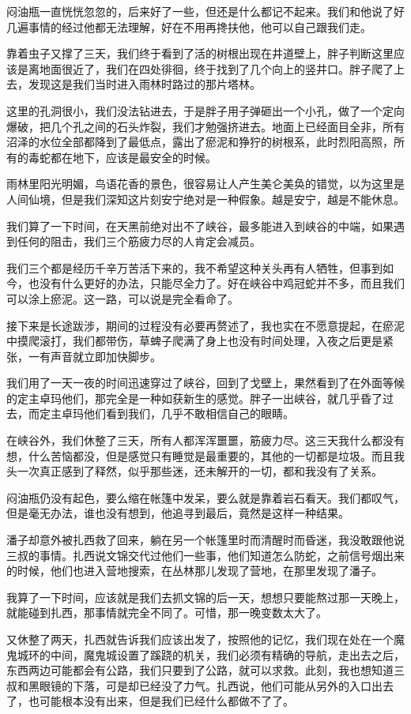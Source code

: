 闷油瓶一直恍恍忽忽的，后来好了一些，但还是什么都记不起来。我们和他说了好几遍事情的经过他都无法理解，好在不用再搀扶他，他可以自己跟我们走。

靠着虫子又撑了三天，我们终于看到了活的树根出现在井道壁上，胖子判断这里应该是离地面很近了，我们在四处徘徊，终于找到了几个向上的竖井口。胖子爬了上去，发现这是我们当时进入雨林时路过的那片塔林。

这里的孔洞很小，我们没法钻进去，于是胖子用子弹砸出一个小孔，做了一个定向爆破，把几个孔之间的石头炸裂，我们才勉强挤进去。地面上已经面目全非，所有沼泽的水位全部都降到了最低点，露出了瘀泥和狰狞的树根系，此时烈阳高照，所有的毒蛇都在地下，应该是最安全的时候。

雨林里阳光明媚，鸟语花香的景色，很容易让人产生美仑美奂的错觉，以为这里是人间仙境，但是我们深知这片刻安宁绝对是一种假象。越是安宁，越是不能休息。

我们算了一下时间，在天黑前绝对出不了峡谷，最多能进入到峡谷的中端，如果遇到任何的阻击，我们三个筋疲力尽的人肯定会减员。

我们三个都是经历千辛万苦活下来的，我不希望这种关头再有人牺牲，但事到如今，也没有什么更好的办法，只能尽全力了。好在峡谷中鸡冠蛇并不多，而且我们可以涂上瘀泥。这一路，可以说是完全看命了。

接下来是长途跋涉，期间的过程没有必要再赘述了，我也实在不愿意提起，在瘀泥中摸爬滚打，我们都带伤，草蜱子爬满了身上也没有时间处理，入夜之后更是紧张，一有声音就立即加快脚步。

我们用了一天一夜的时间迅速穿过了峡谷，回到了戈壁上，果然看到了在外面等候的定主卓玛他们，那完全是一种如获新生的感觉。胖子一出峡谷，就几乎昏了过去，而定主卓玛他们看到我们，几乎不敢相信自己的眼睛。

在峡谷外，我们休整了三天，所有人都浑浑噩噩，筋疲力尽。这三天我什么都没有想，什么苦恼都没，但是感觉只有睡觉是最重要的，其他的一切都是垃圾。而且我头一次真正感到了释然，似乎那些迷，还未解开的一切，都和我没有了关系。

闷油瓶仍没有起色，要么缩在帐篷中发呆，要么就是靠着岩石看天。我们都叹气，但是毫无办法，谁也没有想到，他追寻到最后，竟然是这样一种结果。

潘子却意外被扎西救了回来，躺在另一个帐篷里时而清醒时而昏迷，我没敢跟他说三叔的事情。扎西说文锦交代过他们一些事，他们知道怎么防蛇，之前信号烟出来的时候，他们也进入营地搜索，在丛林那儿发现了营地，在那里发现了潘子。

我算了一下时间，应该就是我们去抓文锦的后一天，想想只要能熬过那一天晚上，就能碰到扎西，那事情就完全不同了。可惜，那一晚变数太大了。

又休整了两天，扎西就告诉我们应该出发了，按照他的记忆，我们现在处在一个魔鬼城环的中间，魔鬼城设置了蹊跷的机关，我们必须有精确的导航，走出去之后，东西两边可能都会有公路，我们只要到了公路，就可以求救。此刻，我也想知道三叔和黑眼镜的下落，可是却已经没了力气。扎西说，他们可能从另外的入口出去了，也可能根本没有出来，但是我们已经什么都做不了了。

